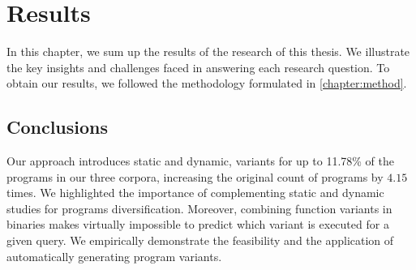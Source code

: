 \chapter{Results} 
\label{chapter:results}

In this chapter, we sum up the results of the research of this thesis.  We illustrate the key insights and challenges faced in answering each research question.  To obtain our results, we followed the methodology formulated in \autoref{chapter:method}.







\section*{Conclusions}

Our approach introduces static and dynamic, variants for up to 11.78\% of the programs in our three corpora, increasing the original count of programs by $4.15$ times. We highlighted the importance of complementing static and dynamic studies for programs diversification. Moreover, combining function variants in binaries makes virtually impossible to predict which variant is executed for a given query. We empirically demonstrate the feasibility and the application of automatically generating \wasm program variants.

